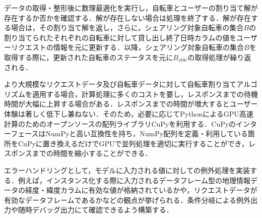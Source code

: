           \par データの取得・整形後に数理最適化を実行し，自転車とユーザーの割り当て解が存在するか否かを確認する．解が存在しない場合は処理を終了する．解が存在する場合は，その割り当て解を返し，さらに，シェアリング対象自転車の集合$B$の割り当てられたそれぞれの自転車に対して貸し出し終了日時カラムの値をユーザーリクエストの情報を元に更新する．以降，シェアリング対象自転車の集合$B$を取得する際に，更新された自転車のステータスを元に$B_{\text{able}}$の取得処理が繰り返される．
          \par より大規模なリクエストデータ及び自転車データに対して自転車割り当てアルゴリズムを適用する場合，計算処理に多くのコストを要し，レスポンスまでの待機時間が大幅に上昇する場合がある．レスポンスまでの時間が増大するとユーザー体験は著しく低下し兼ねない．そのため，必要に応じてPythonによるGPU高速計算のためのオープンソースの配列ライブラリCuPyを利用する．CuPyのインターフェースはNumPyと高い互換性を持ち，NumPy配列を定義・利用している箇所をCuPyに置き換えるだけでGPUで並列処理を適切に実行することができ，レスポンスまでの時間を縮小することができる\cite{CuPy}．
          \par エラーハンドリングとして，モデルに入力される値に対しての例外処理を実装する．例えば，インスタンス化する際に入力されるデータフレーム型の地理情報データの経度・緯度カラムに有効な値が格納されているかや，リクエストデータが有効なデータフレームであるかなどの観点が挙げられる．条件分岐による例外出力や随時デバッグ出力にて確認できるよう構築する．

